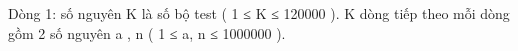 Dòng 1: số nguyên K là số bộ test ( 1 ≤ K ≤ 120000 ). K dòng tiếp theo mỗi dòng gồm 2 số nguyên a , n ( 1 ≤ a, n ≤ 1000000 ).